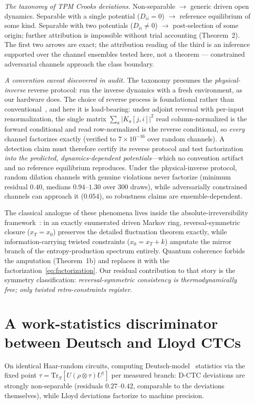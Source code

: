 \documentclass[aps,pra,twocolumn,superscriptaddress,nofootinbib]{revtex4-2}
\newcommand{\Tr}{\mathrm{Tr}}
\begin{document}
\emph{The taxonomy of TPM Crooks deviations.} Non-separable $\rightarrow$ generic driven open dynamics. Separable with a single potential ($D_{ii}=0$) $\rightarrow$ reference equilibrium of some kind. Separable with two potentials ($D_{ii}\neq0$) $\rightarrow$ post-selection of some origin; further attribution is impossible without trial accounting (Theorem~2). The first two arrows are exact; the attribution reading of the third is an inference supported over the channel ensembles tested here, not a theorem --- constrained adversarial channels approach the class boundary.

\emph{A convention caveat discovered in audit.} The taxonomy presumes the \emph{physical-inverse} reverse protocol: run the inverse dynamics with a fresh environment, as our hardware does. The choice of reverse process is foundational rather than conventional~\cite{buscemiscarani2021}, and here it is load-bearing: under adjoint reversal with per-input renormalization, the single matrix $\sum_a|K_a[j,i]|^2$ read column-normalized is the forward conditional and read row-normalized is the reverse conditional, so \emph{every} channel factorizes exactly (verified to $7\times10^{-16}$ over random channels). A detection claim must therefore certify its reverse protocol and test factorization \emph{into the predicted, dynamics-dependent potentials}---which no convention artifact and no reference equilibrium reproduces. Under the physical-inverse protocol, random dilation channels with genuine violations never factorize (minimum residual $0.40$, medians $0.94$--$1.30$ over $300$ draws), while adversarially constrained channels can approach it ($0.054$), so robustness claims are ensemble-dependent.

The classical analogue of these phenomena lives inside the absolute-irreversibility framework~\cite{murashita2014,funo2017,murashita2017feedback,manzano2024}: in an exactly enumerated driven Markov ring, reversal-symmetric closure ($x_T=x_0$) preserves the detailed fluctuation theorem exactly, while information-carrying twisted constraints ($x_0=x_T+k$) amputate the mirror branch of the entropy-production spectrum entirely. Quantum coherence forbids the amputation (Theorem~1b) and replaces it with the factorization~\eqref{eq:factorization}. Our residual contribution to that story is the symmetry classification: \emph{reversal-symmetric consistency is thermodynamically free; only twisted retro-constraints register}.

\section{A work-statistics discriminator between Deutsch and Lloyd CTCs}
On identical Haar-random circuits, computing Deutsch-model~\cite{deutsch1991} statistics via the fixed point $\tau=\Tr_S[U(\rho\otimes\tau)U^\dagger]$ per measured branch: D-CTC deviations are strongly non-separable (residuals $0.27$--$0.42$, comparable to the deviations themselves), while Lloyd deviations factorize to machine precision.
\end{document}
